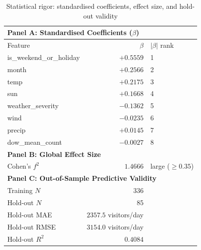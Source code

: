 \begin{table}[htbp]
\centering
\caption{Statistical rigor: standardised coefficients, effect size, and hold-out validity}
\label{tab:statistical_rigor}
\begin{tabular}{lrl}
\toprule
\multicolumn{3}{l}{\textbf{Panel A: Standardised Coefficients ($\beta$)}} \\
\midrule
Feature & $\beta$ & $|\beta|$ rank \\
\midrule
  is\_weekend\_or\_holiday & $+0.5559$ & 1 \\
  month & $+0.2566$ & 2 \\
  temp & $+0.2175$ & 3 \\
  sun & $+0.1668$ & 4 \\
  weather\_severity & $-0.1362$ & 5 \\
  wind & $-0.0235$ & 6 \\
  precip & $+0.0145$ & 7 \\
  dow\_mean\_count & $-0.0027$ & 8 \\
\midrule
\multicolumn{3}{l}{\textbf{Panel B: Global Effect Size}} \\
\midrule
  Cohen's $f^2$ & $1.4666$ & large ($\geq 0.35$) \\
\midrule
\multicolumn{3}{l}{\textbf{Panel C: Out-of-Sample Predictive Validity}} \\
\midrule
  Training $N$ & 336 & \\
  Hold-out $N$ & 85 & \\
  Hold-out MAE & $2357.5$ visitors/day & \\
  Hold-out RMSE & $3154.0$ visitors/day & \\
  Hold-out $R^2$ & $0.4084$ & \\
\bottomrule
\end{tabular}
\end{table}